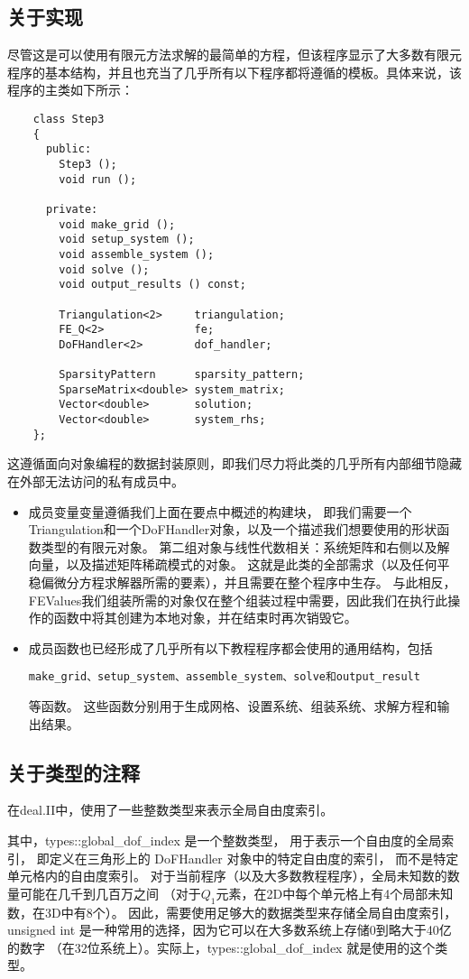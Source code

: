 \documentclass{ctexart}
\begin{document}
\subsection{关于实现}
尽管这是可以使用有限元方法求解的最简单的方程，但该程序显示了大多数有限元程序的基本结构，并且也充当了几乎所有以下程序都将遵循的模板。具体来说，该程序的主类如下所示：
\begin{lstlisting}
    class Step3
    {
      public:
        Step3 ();
        void run ();
     
      private:
        void make_grid ();
        void setup_system ();
        void assemble_system ();
        void solve ();
        void output_results () const;
     
        Triangulation<2>     triangulation;
        FE_Q<2>              fe;
        DoFHandler<2>        dof_handler;
     
        SparsityPattern      sparsity_pattern;
        SparseMatrix<double> system_matrix;
        Vector<double>       solution;
        Vector<double>       system_rhs;
    };
\end{lstlisting}
这遵循面向对象编程的数据封装原则，即我们尽力将此类的几乎所有内部​​细节隐藏在外部无法访问的私有成员中。
\begin{itemize}
    \item 成员变量变量遵循我们上面在要点中概述的构建块，
    即我们需要一个Triangulation和一个DoFHandler对象，以及一个描述我们想要使用的形状函数类型的有限元对象。
    第二组对象与线性代数相关：系统矩阵和右侧以及解向量，以及描述矩阵稀疏模式的对象。
    这就是此类的全部需求（以及任何平稳偏微分方程求解器所需的要素），并且需要在整个程序中生存。
    与此相反，FEValues我们组装所需的对象仅在整个组装过程中需要，因此我们在执行此操作的函数中将其创建为本地对象，并在结束时再次销毁它。
    \item 成员函数也已经形成了几乎所有以下教程程序都会使用的通用结构，包括
    \begin{verbatim}make_grid、setup_system、assemble_system、solve和output_result\end{verbatim}等函数。
    这些函数分别用于生成网格、设置系统、组装系统、求解方程和输出结果。
\end{itemize}

\subsection{关于类型的注释}
在deal.II中，使用了一些整数类型来表示全局自由度索引。

其中，types::global\_dof\_index 是一个整数类型，
用于表示一个自由度的全局索引，
即定义在三角形上的 DoFHandler 对象中的特定自由度的索引，
而不是特定单元格内的自由度索引。
对于当前程序（以及大多数教程程序），全局未知数的数量可能在几千到几百万之间
（对于$ Q_1 $元素，在2D中每个单元格上有4个局部未知数，在3D中有8个）。
因此，需要使用足够大的数据类型来存储全局自由度索引，
unsigned int 是一种常用的选择，因为它可以在大多数系统上存储0到略大于40亿的数字
（在32位系统上）。实际上，types::global\_dof\_index 就是使用的这个类型。
\end{document}
